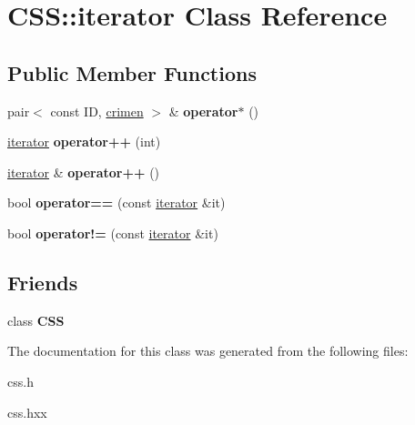 \hypertarget{classCSS_1_1iterator}{}\section{C\+S\+S\+:\+:iterator Class Reference}
\label{classCSS_1_1iterator}
\subsection*{Public Member Functions}
\begin{DoxyCompactItemize}
\item 
\hypertarget{classCSS_1_1iterator_ab6cf2a3e3dd536d15121c50ff6782cee}{}pair$<$ const I\+D, \hyperlink{classcrimen}{crimen} $>$ \& {\bfseries operator$\ast$} ()\label{classCSS_1_1iterator_ab6cf2a3e3dd536d15121c50ff6782cee}

\item 
\hypertarget{classCSS_1_1iterator_a1dec5b9cecf0d9679b0c19b6c32f2736}{}\hyperlink{classCSS_1_1iterator}{iterator} {\bfseries operator++} (int)\label{classCSS_1_1iterator_a1dec5b9cecf0d9679b0c19b6c32f2736}

\item 
\hypertarget{classCSS_1_1iterator_a3f0d85219c1190e393a461ea67e8d4fb}{}\hyperlink{classCSS_1_1iterator}{iterator} \& {\bfseries operator++} ()\label{classCSS_1_1iterator_a3f0d85219c1190e393a461ea67e8d4fb}

\item 
\hypertarget{classCSS_1_1iterator_a9c5b143163f390f4831e502232f0eeb0}{}bool {\bfseries operator==} (const \hyperlink{classCSS_1_1iterator}{iterator} \&it)\label{classCSS_1_1iterator_a9c5b143163f390f4831e502232f0eeb0}

\item 
\hypertarget{classCSS_1_1iterator_a0b713df41e352d67f134711739197258}{}bool {\bfseries operator!=} (const \hyperlink{classCSS_1_1iterator}{iterator} \&it)\label{classCSS_1_1iterator_a0b713df41e352d67f134711739197258}

\end{DoxyCompactItemize}
\subsection*{Friends}
\begin{DoxyCompactItemize}
\item 
\hypertarget{classCSS_1_1iterator_a2647c6d562bc3a1ae58b7b649a0d6a02}{}class {\bfseries C\+S\+S}\label{classCSS_1_1iterator_a2647c6d562bc3a1ae58b7b649a0d6a02}

\end{DoxyCompactItemize}


The documentation for this class was generated from the following files\+:\begin{DoxyCompactItemize}
\item 
css.\+h\item 
css.\+hxx\end{DoxyCompactItemize}
